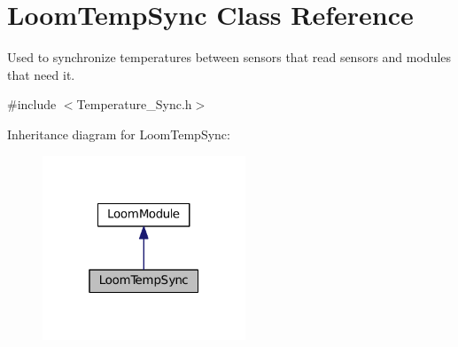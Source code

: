 \hypertarget{class_loom_temp_sync}{}\section{Loom\+Temp\+Sync Class Reference}
\label{class_loom_temp_sync}


Used to synchronize temperatures between sensors that read sensors and modules that need it.  




{\ttfamily \#include $<$Temperature\+\_\+\+Sync.\+h$>$}



Inheritance diagram for Loom\+Temp\+Sync\+:\nopagebreak
\begin{figure}[H]
\begin{center}
\leavevmode
\includegraphics[width=172pt]{class_loom_temp_sync__inherit__graph}
\end{center}
\end{figure}
